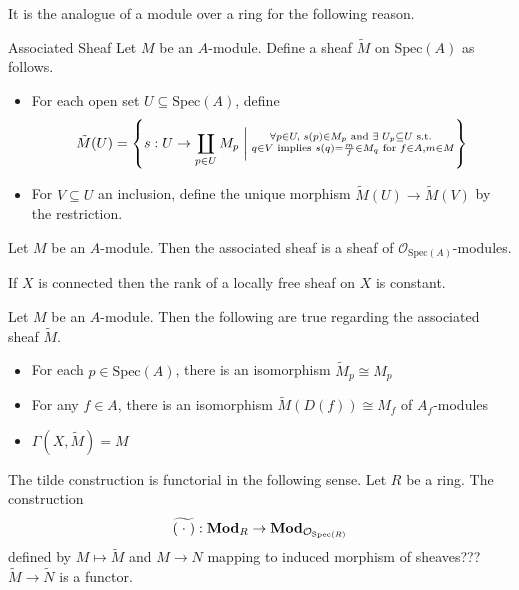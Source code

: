 \documentclass[a4paper]{article}
\begin{document}
It is the analogue of a module over a ring for the following reason. 

\begin{defn}{Associated Sheaf}{} Let $M$ be an $A$-module. Define a sheaf $\tilde{M}$ on $\text{Spec}(A)$ as follows. 
\begin{itemize}
\item For each open set $U\subseteq\text{Spec}(A)$, define $$\tilde{M}(U)=\left\{s:U\to\coprod_{p\in U}M_p\;\bigg{|}\;\substack{\forall p\in U,\;s(p)\in M_p\text{ and }\exists\;U_p\subseteq U\text{ s.t. }\\q\in V\text{ implies }s(q)=\frac{m}{f}\in M_q\text{ for }f\in A,m\in M}\right\}$$
\item For $V\subseteq U$ an inclusion, define the unique morphism $\tilde{M}(U)\to\tilde{M}(V)$ by the restriction. 
\end{itemize}
\end{defn}

\begin{lmm}{}{} Let $M$ be an $A$-module. Then the associated sheaf is a sheaf of $\mathcal{O}_{\text{Spec}(A)}$-modules. 
\end{lmm}

\begin{lmm}{}{} If $X$ is connected then the rank of a locally free sheaf on $X$ is constant. 
\end{lmm}

\begin{thm}{}{} Let $M$ be an $A$-module. Then the following are true regarding the associated sheaf $\tilde{M}$. 
\begin{itemize}
\item For each $p\in\text{Spec}(A)$, there is an isomorphism $\tilde{M}_p\cong M_p$
\item For any $f\in A$, there is an isomorphism $\tilde{M}(D(f))\cong M_f$ of $A_f$-modules
\item $\Gamma(X,\tilde{M})=M$
\end{itemize}
\end{thm}

\begin{thm}{}{} The tilde construction is functorial in the following sense. Let $R$ be a ring. The construction $$\widetilde{(\;\cdot\;)}:\bold{Mod}_R\to\bold{Mod}_{\mathcal{O}_{\text{Spec}(R)}}$$ defined by $M\mapsto\widetilde{M}$ and $M\to N$ mapping to induced morphism of sheaves??? $\widetilde{M}\to\widetilde{N}$ is a functor. 
\end{thm}
\end{document}
